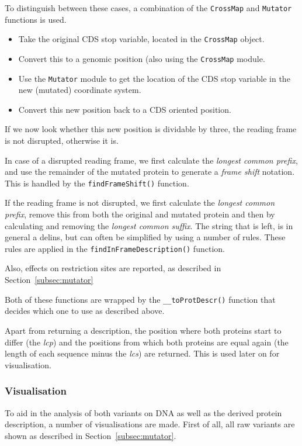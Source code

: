 \documentclass{article}
\begin{document}
To distinguish between these cases, a combination of the \texttt{CrossMap}
and \texttt{Mutator} functions is used.

\begin{itemize} %
\item Take the original CDS stop variable, located in the \texttt{CrossMap}
      object.
\item Convert this to a genomic position (also using the \texttt{CrossMap}
      module.
\item Use the \texttt{Mutator} module to get the location of the CDS stop
      variable in the new (mutated) coordinate system.
\item Convert this new position back to a CDS oriented position.
\end{itemize}

If we now look whether this new position is dividable by three, the reading
frame is not disrupted, otherwise it is.

In case of a disrupted reading frame, we first calculate the \emph{longest
common prefix}, and use the remainder of the mutated protein to generate
a \emph{frame shift} notation. This is handled by the \texttt{findFrameShift()}
function.

If the reading frame is not disrupted, we first calculate the \emph{longest
common prefix}, remove this from both the original and mutated protein and then
by calculating and removing the \emph{longest common suffix}. The string that
is left, is in general a delins, but can often be simplified by using a number
of rules. These rules are applied in the \texttt{findInFrameDescription()}
function.

Also, effects on restriction sites are reported, as described in
Section~\ref{subsec:mutator}

Both of these functions are wrapped by the \texttt{\_\_toProtDescr()} function
that decides which one to use as described above.

Apart from returning a description, the position where both proteins start
to differ (the \emph{lcp}) and the positions from which both proteins are equal
again (the length of each sequence minus the \emph{lcs}) are returned. This is
used later on for visualisation.

\subsubsection{Visualisation} \label{subsubsec:visualisation}
To aid in the analysis of both variants on DNA as well as the derived protein
description, a number of visualisations are made. First of all, all raw
variants are shown as described in Section~\ref{subsec:mutator}.
\end{document}

